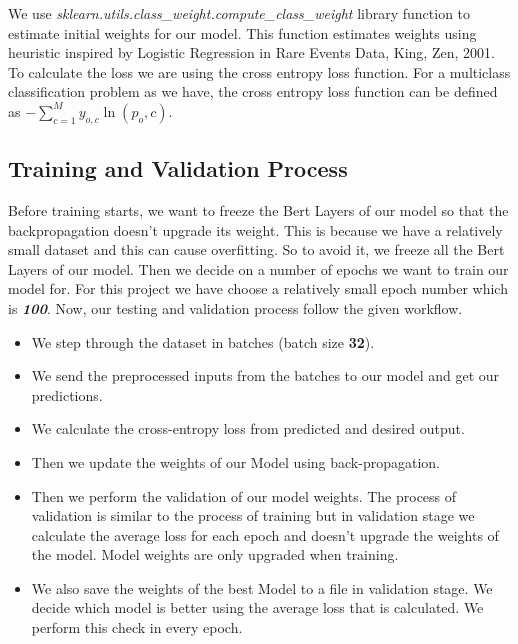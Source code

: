 \documentclass[a4paper, 12pt]{article}
\begin{document}
\begin{sloppypar}
\begin{itemize}
  \end{itemize}
  
  We use \textit{sklearn.utils.class\_weight.compute\_class\_weight} library function to estimate initial weights for our model. This function estimates weights using heuristic inspired by  Logistic Regression in Rare Events Data, King, Zen, 2001.\cite{king_logistic_2001}
  To calculate the loss we are using the cross entropy loss function. For a multiclass classification problem as we have, the cross entropy loss function can be defined as \large $- \sum_{c=1}^{M} y_{o,c} \ln(p_o,c)$.\cite{noauthor_loss_nodate}
  \normalsize
  
  \subsection{Training and Validation Process}
  Before training starts, we want to freeze the Bert Layers of our model so that the backpropagation doesn't upgrade its weight. This is because we have a relatively small dataset and this can cause overfitting. So to avoid it, we freeze all the Bert Layers of our model. Then we decide on a number of epochs we want to train our model for. For this project we have choose a relatively small epoch number which is \textbf{\textit{100}}. Now, our testing and validation process follow the given workflow.
  \begin{itemize}
  \item We step through the dataset in batches (batch size \textbf{32}).
  \item We send the preprocessed inputs from the batches to our model and get our predictions.
  \item We calculate the cross-entropy loss from predicted and desired output.
  \item Then we update the weights of our Model using back-propagation. 
  \item Then we perform the validation of our model weights. The process of validation is similar to the process of training but in validation stage we calculate the average loss for each epoch and doesn't upgrade the weights of the model. Model weights are only upgraded when training.
  \item We also save the weights of the best Model to a file in validation stage. We decide which model is better using the average loss that is calculated. We perform this check in every epoch.
  \end{itemize}
  

\end{sloppypar}
\end{document}
